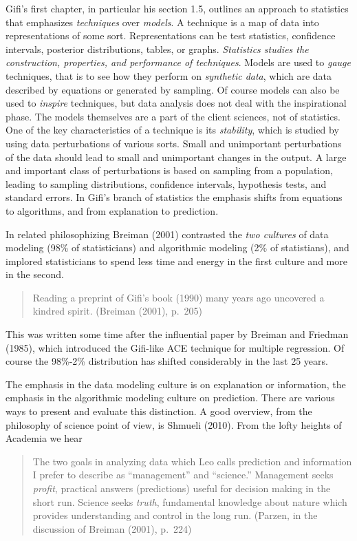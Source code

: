 \documentclass[
  12pt,
  letterpaper,
  DIV=11,
  numbers=noendperiod]{scrreprt}
\begin{document}
Gifi's first chapter, in particular his section 1.5, outlines an
approach to statistics that emphasizes \emph{techniques} over
\emph{models}. A technique is a map of data into representations of some
sort. Representations can be test statistics, confidence intervals,
posterior distributions, tables, or graphs. \emph{Statistics studies the
construction, properties, and performance of techniques}. Models are
used to \emph{gauge} techniques, that is to see how they perform on
\emph{synthetic data}, which are data described by equations or
generated by sampling. Of course models can also be used to
\emph{inspire} techniques, but data analysis does not deal with the
inspirational phase. The models themselves are a part of the client
sciences, not of statistics. One of the key characteristics of a
technique is its \emph{stability}, which is studied by using data
perturbations of various sorts. Small and unimportant perturbations of
the data should lead to small and unimportant changes in the output. A
large and important class of perturbations is based on sampling from a
population, leading to sampling distributions, confidence intervals,
hypothesis tests, and standard errors. In Gifi's branch of statistics
the emphasis shifts from equations to algorithms, and from explanation
to prediction.

In related philosophizing Breiman (2001) contrasted the \emph{two
cultures} of data modeling (98\% of statisticians) and algorithmic
modeling (2\% of statistians), and implored statisticians to spend less
time and energy in the first culture and more in the second.

\begin{quote}
Reading a preprint of Gifi's book (1990) many years ago uncovered a
kindred spirit. (Breiman (2001), p.~205)
\end{quote}

This was written some time after the influential paper by Breiman and
Friedman (1985), which introduced the Gifi-like ACE technique for
multiple regression. Of course the 98\%-2\% distribution has shifted
considerably in the last 25 years.

The emphasis in the data modeling culture is on explanation or
information, the emphasis in the algorithmic modeling culture on
prediction. There are various ways to present and evaluate this
distinction. A good overview, from the philosophy of science point of
view, is Shmueli (2010). From the lofty heights of Academia we hear

\begin{quote}
The two goals in analyzing data which Leo calls prediction and
information I prefer to describe as ``management'' and ``science.''
Management seeks \emph{profit}, practical answers (predictions) useful
for decision making in the short run. Science seeks \emph{truth},
fundamental knowledge about nature which provides understanding and
control in the long run. (Parzen, in the discussion of Breiman (2001),
p.~224)
\end{quote}
\end{document}
